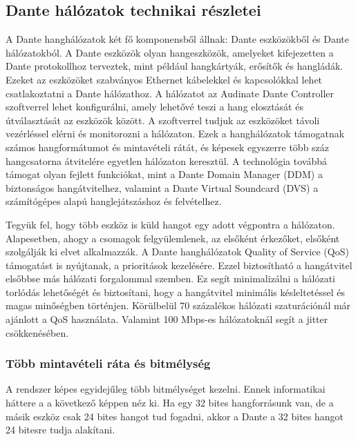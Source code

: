 \subsection{Dante hálózatok technikai részletei}
A Dante hanghálózatok két fő komponensből állnak: Dante eszközökből
és Dante hálózatokból. A Dante eszközök olyan hangeszközök, amelyeket
kifejezetten a Dante protokollhoz terveztek, mint például hangkártyák, erősítők
és hangládák. Ezeket az eszközöket szabványos Ethernet kábelekkel és
kapcsolókkal lehet csatlakoztatni a Dante hálózathoz.
A hálózatot az Audinate Dante Controller szoftverrel lehet
konfigurálni, amely lehetővé teszi a hang elosztását és útválasztását az
eszközök között. A szoftverrel tudjuk az eszközöket távoli vezérléssel elérni és
monitorozni a hálózaton. Ezek a hanghálózatok támogatnak számos
hangformátumot és mintavételi rátát, és képesek egyszerre több száz hangcsatorna
átvitelére egyetlen hálózaton keresztül. A technológia továbbá támogat olyan
fejlett funkciókat, mint a Dante Domain Manager (DDM) a biztonságos
hangátvitelhez, valamint a Dante Virtual Soundcard (DVS) a számítógépes alapú
hanglejátszáshoz és felvételhez. 

Tegyük fel, hogy több eszköz is küld hangot egy adott végpontra a hálózaton.
Alapesetben, ahogy a csomagok felgyülemlenek, az elsőként érkezőket, elsőként szolgálják ki elvet alkalmazzák.
A Dante hanghálózatok Quality of Service (QoS)
támogatást is nyújtanak, a prioritások kezelésére.
Ezzel biztosítható a hangátvitel elsőbbse más hálózati forgalommal szemben. Ez segít minimalizálni a hálózati
torlódás lehetőségét és biztosítani, hogy a hangátvitel minimális késleltetéssel
és magas minőségben történjen. 
Körülbelül 70 százalékos hálózati szaturációnál már ajánlott a QoS használata.
Valamint 100 Mbps-es hálózatoknál segít a jitter csökkenésében.

\subsubsection{Több mintavételi ráta és bitmélység}

A rendszer képes egyidejűleg több bitmélységet kezelni. Ennek informatikai háttere a
a következő képpen néz ki. Ha egy 32 bites hangforrásunk van, de a másik eszköz
csak 24 bites hangot tud fogadni, akkor a Dante a 32 bites hangot 24 bitesre tudja 
alakítani.

